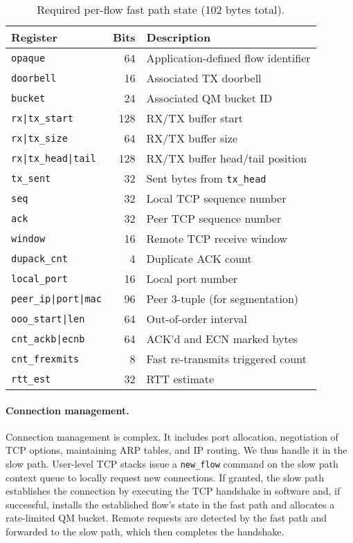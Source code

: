 \begin{table}
  \centering
  \small
  \begin{tabular}{lrl}
    \textbf{Register} & \textbf{Bits} & \textbf{Description} \\
    \hline
    \verb+opaque+ & 64 & Application-defined flow identifier \\
    \verb+doorbell+ & 16 & Associated TX doorbell \\
    \verb+bucket+ & 24 & Associated QM bucket ID \\
    \verb+rx|tx_start+ & 128 & RX/TX buffer start \\
    \verb+rx|tx_size+ & 64 & RX/TX buffer size \\
    \verb+rx|tx_head|tail+ & 128 & RX/TX buffer head/tail position \\
    \verb+tx_sent+ & 32 & Sent bytes from \verb+tx_head+ \\
    \verb+seq+ & 32 & Local TCP sequence number \\
    \verb+ack+ & 32 & Peer TCP sequence number \\
    \verb+window+ & 16 & Remote TCP receive window \\
    \verb+dupack_cnt+ & 4 & Duplicate ACK count \\
    \verb+local_port+ & 16 & Local port number \\
    \verb+peer_ip|port|mac+ & 96 & Peer 3-tuple (for segmentation) \\
    \verb+ooo_start|len+ & 64 & Out-of-order interval \\
    \verb+cnt_ackb|ecnb+ & 64 & ACK'd and ECN marked bytes \\
    \verb+cnt_frexmits+ & 8 & Fast re-transmits triggered count \\
    \verb+rtt_est+ & 32 & RTT estimate \\
  \end{tabular}
  \caption{Required per-flow fast path state (102 bytes total).}
  \label{tab:nic_state}
\end{table}

\paragraph{Connection management.} Connection management is
complex. It includes port allocation, negotiation of TCP options,
maintaining ARP tables, and IP routing. We thus handle it in the slow
path. User-level TCP stacks issue a \verb+new_flow+ command on the
slow path context queue to locally request new connections. If
granted, the slow path establishes the connection by executing the TCP
handshake in software and, if successful, installs the established
flow's state in the fast path and allocates a rate-limited QM
bucket. Remote requests are detected by the fast path and forwarded to
the slow path, which then completes the handshake.

